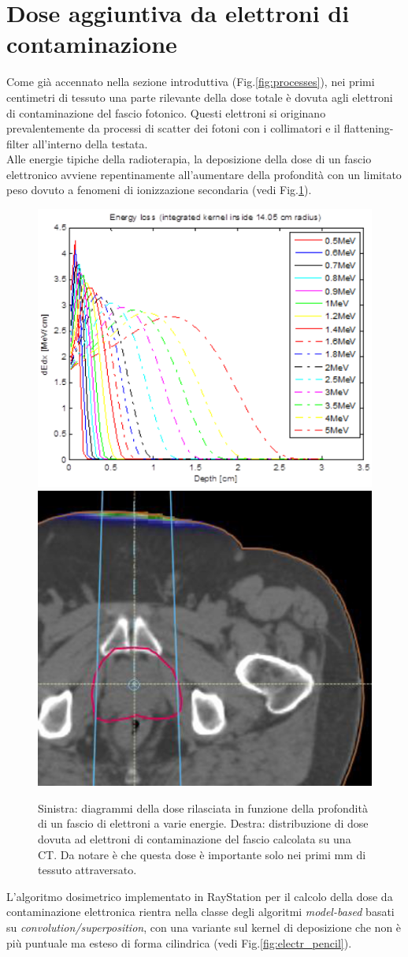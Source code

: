 {\section{Dose aggiuntiva da elettroni di contaminazione}
Come già accennato nella sezione introduttiva (Fig.\ref{fig:processes}), nei primi centimetri di tessuto una parte rilevante della dose totale è dovuta agli elettroni di contaminazione del fascio fotonico. Questi elettroni si originano prevalentemente da processi di scatter dei fotoni con i collimatori e il flattening-filter all'interno della testata.\\
Alle energie tipiche della radioterapia, la deposizione della dose di un fascio elettronico avviene repentinamente all'aumentare della profondità con un limitato peso dovuto a fenomeni di ionizzazione secondaria (vedi Fig.\ref{fig:electr_enloss}).
\begin{figure}
\centering
\includegraphics[width=.5\textwidth]{./cap1/electr_enloss.png}
\includegraphics[width=.45\textwidth]{./cap1/electr_doseCT.png}
\caption{Sinistra: diagrammi della dose rilasciata in funzione della profondità di un fascio di elettroni a varie energie. Destra: distribuzione di dose dovuta ad elettroni di contaminazione del fascio calcolata su una CT. Da notare è che questa dose è importante solo nei primi mm di tessuto attraversato.}
\label{fig:electr_enloss}
\end{figure}

L'algoritmo dosimetrico implementato in RayStation per il calcolo della dose da contaminazione elettronica rientra nella classe degli algoritmi \textit{model-based} basati su \textit{convolution/superposition}, con una variante sul kernel di deposizione che non è più puntuale ma esteso di forma cilindrica (vedi Fig.\ref{fig:electr_pencil}). 

}
